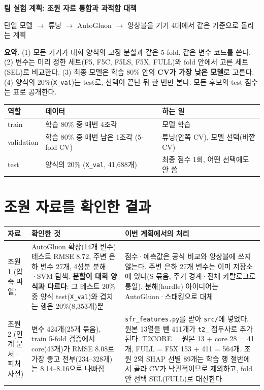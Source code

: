 \documentclass[10pt,a4paper]{article}
\newcommand{\col}[1]{\texttt{\small #1}}
\newcommand{\keybox}[1]{\par\smallskip\noindent\colorbox{boxbg}{\parbox{\dimexpr\linewidth-2\fboxsep}{\small #1}}\par\smallskip}
\begin{document}
{\sffamily\LARGE\bfseries\color{acc} 팀 실험 계획: 조원 자료 통합과 과적합 대책}\par
\vspace{0.3em}
{\sffamily\small 단일 모델 $\to$ 튜닝 $\to$ AutoGluon $\to$ 앙상블을 기기 4대에서 같은 기준으로 돌리는 계획}

\keybox{\textbf{요약.} (1) 모든 기기가 대회 양식의 고정 분할과 같은 5-fold, 같은 변수 코드를 쓴다. (2) 변수는 미리 정한 세트(F5, F5C, F5LS, F5X, FULL)와 fold 안에서 고른 세트(SEL)로 비교한다. (3) 최종 모델은 학습 80\% 안의 \textbf{CV가 가장 낮은 모델}로 고른다. (4) 양식의 20\%(\col{X\_val})는 test로, 선택이 끝난 뒤 한 번만 본다. 모든 후보의 test 점수는 표로 공개한다.}

\begin{center}
\begin{tabularx}{0.92\linewidth}{@{}l l Y@{}}
\toprule
역할 & 데이터 & 하는 일\\
\midrule
train & 학습 80\% 중 매번 4조각 & 모델 학습\\
validation & 학습 80\% 중 매번 남은 1조각 (5-fold CV) & 튜닝(안쪽 CV), 모델 선택(바깥 CV)\\
test & 양식의 20\% (\col{X\_val}, 41,688개) & 최종 점수 1회, 어떤 선택에도 안 씀\\
\bottomrule
\end{tabularx}
\end{center}

\section{조원 자료를 확인한 결과}

\begin{tabularx}{\linewidth}{@{}l Y Y@{}}
\toprule
자료 & 확인한 것 & 이번 계획에서의 처리\\
\midrule
조원 1 (압축 파일) & AutoGluon 확장(14개 변수) 테스트 RMSE 8.72, 주변 은하 변수 27개, 4성분 분해·SVM 탐색. \textbf{분할이 대회 양식과 다르다}: 그 테스트 20\% 중 양식 test(\col{X\_val})와 겹치는 행은 20\%(8,353개)뿐 & 점수·예측값은 공식 비교와 앙상블에 쓰지 않는다. 주변 은하 27개 변수는 이미 저장소에 있다(S 묶음, 주기 경계·전체 카탈로그로 통일). 분해(hurdle) 아이디어는 AutoGluon·스태킹으로 대체\\
조원 2 (인계 문서·피처사전) & 변수 424개(25개 묶음), train 5-fold 검증에서 core(43개)가 RMSE 8.08로 가장 좋고 전부(234–328개)는 8.14–8.16으로 나빠짐 & \col{sfr\_features.py}를 받아 \col{src/}에 넣었다. 원본 13열을 뺀 411개가 \col{t2\_} 접두사로 추가된다. T2CORE = 원본 13 + core 28 = 41개, FULL = F5X 153 + 411 = 564개. 조원 2의 SHAP 선별 89개는 학습 행 절반에서 골라 CV가 낙관적이므로 제외하고, fold 안 선택 SEL(FULL)로 대신한다\\
\bottomrule
\end{tabularx}
\end{document}
